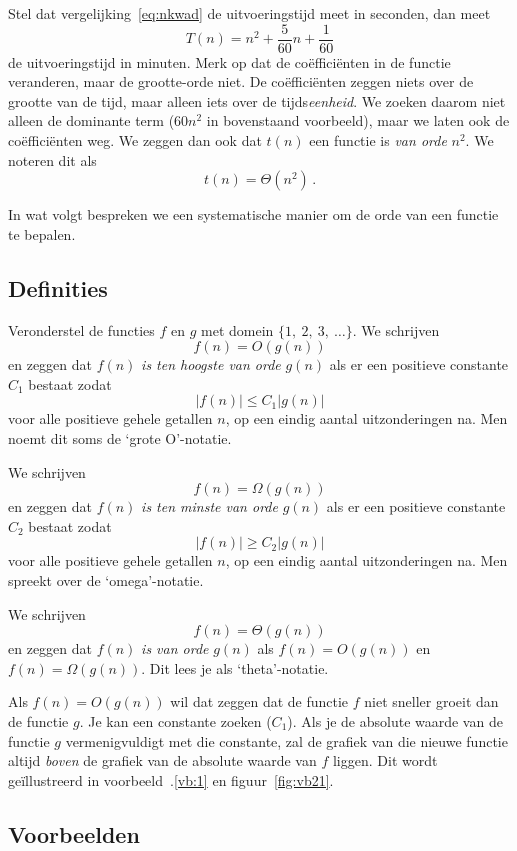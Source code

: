 Stel dat vergelijking~\eqref{eq:nkwad} de uitvoeringstijd meet in seconden, dan meet 
\begin{equation*}
T(n)=n^2+\frac5{60}n+\frac1{60}
\end{equation*}
de uitvoeringstijd in minuten. Merk op dat de coëfficiënten in de functie veranderen, maar de grootte-orde niet. De coëfficiënten zeggen niets over de grootte van de tijd, maar alleen iets over de tijds\emph{eenheid}. We zoeken daarom niet alleen de dominante term ($60n^2$ in bovenstaand voorbeeld), maar we laten ook de coëfficiënten weg. We zeggen dan ook dat $t(n)$ een functie is \emph{van orde} $n^2$. We noteren dit als
\begin{equation*}
t(n)=\Theta(n^2)\,.
\end{equation*}

In wat volgt bespreken we een systematische manier om de orde van een functie te bepalen.

\subsection{Definities}
Veronderstel de functies $f$ en $g$ met domein $\{1,~2,~3,~\dots\}$.
We schrijven
\[
f(n)=O(g(n))
\]
en zeggen dat $f(n)$ \emph{is ten hoogste van orde} $g(n)$ als er een positieve constante $C_1$ bestaat zodat
\[
|f(n)|\leq C_1|g(n)|
\]
voor alle  positieve gehele getallen $n$, op een eindig aantal uitzonderingen na. Men noemt dit soms de `grote O'-notatie.

We schrijven
\[
f(n)=\Omega(g(n))
\]
en zeggen dat $f(n)$ \emph{is ten minste van orde} $g(n)$ als er een positieve constante $C_2$ bestaat zodat
\[
|f(n)|\geq C_2|g(n)|
\]
voor alle  positieve gehele getallen $n$, op een eindig aantal uitzonderingen na.  Men spreekt over de `omega'-notatie.

We schrijven
\[
f(n)=\Theta(g(n))
\]
en zeggen dat $f(n)$ \emph{is van orde} $g(n)$ als $f(n)=O(g(n))$ en $f(n)=\Omega(g(n))$. Dit lees je als `theta'-notatie.

Als $f(n)=O(g(n))$ wil dat zeggen dat de functie $f$ niet sneller groeit dan de functie $g$. Je kan een constante zoeken ($C_1$). Als je de absolute waarde van de  functie $g$ vermenigvuldigt met die constante, zal de grafiek van die nieuwe functie altijd \emph{boven} de grafiek van de absolute waarde van $f$ liggen. Dit wordt geïllustreerd in voorbeeld~\thesection.\ref{vb:1} en figuur~\ref{fig:vb21}.

\subsection{Voorbeelden}


